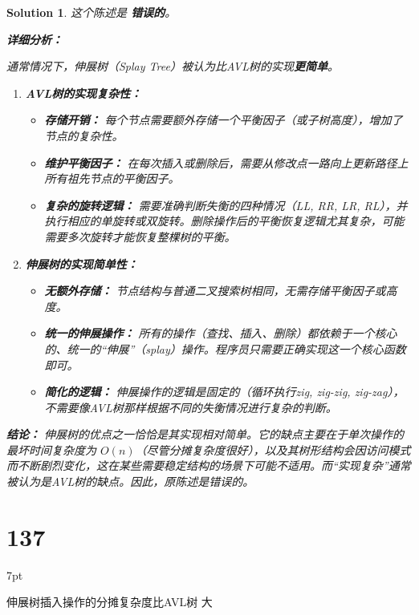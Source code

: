 \documentclass[UTF8]{report}
\newtheorem{solution}{Solution}
\theoremstyle{MyLineTheoremStyle} %
\theoremstyle{MyBlockTheoremStyle} %
\theoremstyle{MySubsubsectionStyle} %
\newenvironment{graybox}{%
        \def\FrameCommand{%
        \hspace{1pt}%
        {\color{gray}\small \vrule width 2pt}%
        {\color{graybox_color}\vrule width 4pt}%
        \colorbox{graybox_color}%
        }%
        \MakeFramed{\advance\hsize-\width\FrameRestore}%
        \noindent\hspace{-4.55pt}%
        \begin{adjustwidth}{}{7pt}%
        \vspace{2pt}\vspace{2pt}%
        }
        {%
        \vspace{2pt}\end{adjustwidth}\endMakeFramed%
        }
\begin{document}
\begin{solution}
这个陈述是 \textbf{错误的}。

\textbf{详细分析：}

通常情况下，伸展树（Splay Tree）被认为比AVL树的实现\textbf{更简单}。

\begin{enumerate}
    \item \textbf{AVL树的实现复杂性：}
    \begin{itemize}
        \item \textbf{存储开销：} 每个节点需要额外存储一个平衡因子（或子树高度），增加了节点的复杂性。
        \item \textbf{维护平衡因子：} 在每次插入或删除后，需要从修改点一路向上更新路径上所有祖先节点的平衡因子。
        \item \textbf{复杂的旋转逻辑：} 需要准确判断失衡的四种情况（LL, RR, LR, RL），并执行相应的单旋转或双旋转。删除操作后的平衡恢复逻辑尤其复杂，可能需要多次旋转才能恢复整棵树的平衡。
    \end{itemize}

    \item \textbf{伸展树的实现简单性：}
    \begin{itemize}
        \item \textbf{无额外存储：} 节点结构与普通二叉搜索树相同，无需存储平衡因子或高度。
        \item \textbf{统一的伸展操作：} 所有的操作（查找、插入、删除）都依赖于一个核心的、统一的“伸展”（splay）操作。程序员只需要正确实现这一个核心函数即可。
        \item \textbf{简化的逻辑：} 伸展操作的逻辑是固定的（循环执行zig, zig-zig, zig-zag），不需要像AVL树那样根据不同的失衡情况进行复杂的判断。
    \end{itemize}
\end{enumerate}

\textbf{结论：}
伸展树的优点之一恰恰是其实现相对简单。它的缺点主要在于单次操作的最坏时间复杂度为 $O(n)$（尽管分摊复杂度很好），以及其树形结构会因访问模式而不断剧烈变化，这在某些需要稳定结构的场景下可能不适用。而“实现复杂”通常被认为是AVL树的缺点。因此，原陈述是错误的。
\end{solution}

\section*{137}
\begin{graybox}
伸展树插入操作的分摊复杂度比AVL树
大
\end{graybox}
\end{document}
